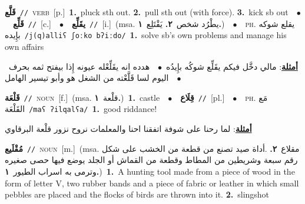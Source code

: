 \documentclass[10pt,a4paper,twoside]{article} %
\begin{document}
\begin{multicols}{2}
{\setlength\topsep{0pt}\textbf{\foreignlanguage{arabic}{قَلَّع}}\ {\color{gray}\texttt{//}\color{black}}\ \textsc{verb}\ [p.]\ \textbf{1.}~pluck sth out.  \textbf{2.}~pull sth out (with force).  \textbf{3.}~kick sb out\ \ $\bullet$\ \ \setlength\topsep{0pt}\textbf{\foreignlanguage{arabic}{قَلِّع}}\ {\color{gray}\texttt{//}\color{black}}\ [c.]\ \ $\bullet$\ \ \setlength\topsep{0pt}\textbf{\foreignlanguage{arabic}{يقَلِّع}}\ {\color{gray}\texttt{//}\color{black}}\ [i.]\ \color{gray}(msa. \foreignlanguage{arabic}{يطْرُد شخص}~\foreignlanguage{arabic}{\textbf{٢.}}  \foreignlanguage{arabic}{يَقْتَلِع}~\foreignlanguage{arabic}{\textbf{١.}})\color{black}\ \ $\bullet$\ \ \textsc{ph.} \color{gray} \foreignlanguage{arabic}{يقلع شوكه بإِيده}\color{black}\ {\color{gray}\texttt{/{\sffamily j(q)alliʕ ʃoːko bʔiːdo}/}\color{black}}\ \textbf{1.}~solve sb's own problems and manage his own affairs\  \begin{flushright}\color{gray}\foreignlanguage{arabic}{\textbf{\underline{\foreignlanguage{arabic}{أمثلة}}}: مالي دخَّل فيكم يقَلِّع شوكُه بإِيدُه\ $\bullet$\ \  هدده انه يقَلِّعْله عيونه إِذا بيفتح ثمه بحرف\ $\bullet$\ \  اليوم لسا قَلَّعْته من الشغل هو وأبو تيسير الهامل}\end{flushright}\color{black}} \vspace{2mm}

{\setlength\topsep{0pt}\textbf{\foreignlanguage{arabic}{قَلْعَة}}\ {\color{gray}\texttt{//}\color{black}}\ \textsc{noun}\ [f.]\ \color{gray}(msa. \foreignlanguage{arabic}{قلْعة}~\foreignlanguage{arabic}{\textbf{١.}})\color{black}\ \textbf{1.}~castle\ \ $\bullet$\ \ \setlength\topsep{0pt}\textbf{\foreignlanguage{arabic}{قِلَاع}}\ {\color{gray}\texttt{//}\color{black}}\ [pl.]\ \ $\bullet$\ \ \textsc{ph.} \color{gray} \foreignlanguage{arabic}{مَع القَلْعَة}\color{black}\ {\color{gray}\texttt{/{\sffamily maʕ ʔilqalʕa}/}\color{black}}\ \textbf{1.}~good riddance!\  \begin{flushright}\color{gray}\foreignlanguage{arabic}{\textbf{\underline{\foreignlanguage{arabic}{أمثلة}}}: لما رحنا على شوفة اتفقنا احنا والمعلمات نروح نزور قلْعة البرقاوي}\end{flushright}\color{black}} \vspace{2mm}

{\setlength\topsep{0pt}\textbf{\foreignlanguage{arabic}{مُقْلَيع}}\ {\color{gray}\texttt{//}\color{black}}\ \textsc{noun}\ [m.]\ \color{gray}(msa. \foreignlanguage{arabic}{مقلاع}~\foreignlanguage{arabic}{\textbf{٢.}}  .\foreignlanguage{arabic}{أداة صيد تصنع من قطعة من الخشب على شكل رقم سبعة وشريطين من المطاط وقطعة من القماش أو الجلد يوضع فيها حصى صغيره وترمى به اسراب الطيور}~\foreignlanguage{arabic}{\textbf{١.}})\color{black}\ \textbf{1.}~A hunting tool made from a piece of wood in the form of letter V,  two rubber bands and a piece of fabric or leather in which small pebbles are placed and the flocks of birds are thrown into it.  \textbf{2.}~slingshot\ } \vspace{2mm}


\end{multicols}
\end{document}
